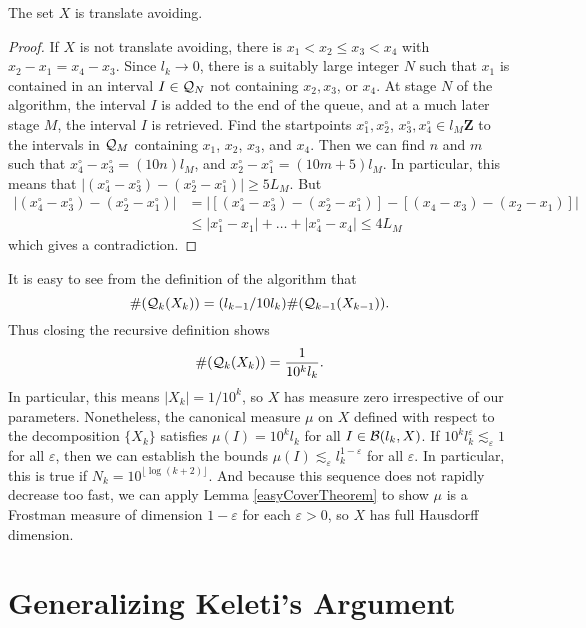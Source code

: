 \begin{lemma}
    The set $X$ is translate avoiding.
\end{lemma}
\begin{proof}
    If $X$ is not translate avoiding, there is $x_1 < x_2 \leq x_3 < x_4$ with $x_2 - x_1 = x_4 - x_3$. Since $l_k \to 0$, there is a suitably large integer $N$ such that $x_1$ is contained in an interval $I \in \operatorname{\mathcal{Q}}_N$ not containing $x_2,x_3$, or $x_4$. At stage $N$ of the algorithm, the interval $I$ is added to the end of the queue, and at a much later stage $M$, the interval $I$ is retrieved. Find the startpoints $x_1^\circ, x_2^\circ$, $x_3^\circ, x_4^\circ \in l_M \mathbf{Z}$ to the intervals in $\operatorname{\mathcal{Q}}_M$ containing $x_1$, $x_2$, $x_3$, and $x_4$. Then we can find $n$ and $m$ such that $x_4^\circ - x_3^\circ = (10n)l_M$, and $x_2^\circ - x_1^\circ = (10m + 5)l_M$. In particular, this means that $|(x_4^\circ - x_3^\circ) - (x_2^\circ - x_1^\circ)| \geq 5L_M$. But
    \begin{align*}
        |(x_4^\circ - x_3^\circ) - (x_2^\circ - x_1^\circ)| &= |[(x_4^\circ - x_3^\circ) - (x_2^\circ - x_1^\circ)] - [(x_4 - x_3) - (x_2 - x_1)]|\\
        &\leq |x_1^\circ - x_1| + \dots + |x_4^\circ - x_4| \leq 4 L_M
    \end{align*}
    which gives a contradiction.
\end{proof}

It is easy to see from the definition of the algorithm that
%
\[ \# (\operatorname{\mathcal{Q}}_k(X_k)) = (l_{k-1}/10l_k) \#(\operatorname{\mathcal{Q}}_{k-1}(X_{k-1})). \]
%
Thus closing the recursive definition shows
%
\[ \#(\operatorname{\mathcal{Q}}_k(X_k)) = \frac{1}{10^k l_k}. \]
%
In particular, this means $|X_k| = 1/10^k$, so $X$ has measure zero irrespective of our parameters. Nonetheless, the canonical measure $\mu$ on $X$ defined with respect to the decomposition $\{ X_k \}$ satisfies $\mu(I) = 10^k l_k$ for all $I \in \operatorname{\mathcal{B}}(l_k,X)$. If $10^k l_k^\varepsilon \lesssim_\varepsilon 1$ for all $\varepsilon$, then we can establish the bounds $\mu(I) \lesssim_\varepsilon l_k^{1-\varepsilon}$ for all $\varepsilon$. In particular, this is true if $N_k = 10^{\lfloor \log(k + 2) \rfloor}$. And because this sequence does not rapidly decrease too fast, we can apply Lemma \ref{easyCoverTheorem} to show $\mu$ is a Frostman measure of dimension $1-\varepsilon$ for each $\varepsilon > 0$, so $X$ has full Hausdorff dimension.



\section{Generalizing Keleti's Argument}

